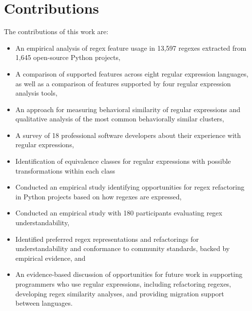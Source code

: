 \section{Contributions}

The contributions of this work are:
\begin{itemize} \setlength \itemsep{.1pt}
    \item An empirical analysis of regex feature usage in 13,597 regexes extracted from 1,645 open-source Python projects,
    \item A comparison of supported features across eight regular expression languages, as well as a comparison of features supported by four regular expression analysis tools,
    \item An approach for measuring behavioral similarity of regular expressions and qualitative analysis of the most common behaviorally similar clusters,
    \item A survey of 18 professional software developers about their experience with regular expressions,
    \item Identification of equivalence classes for regular expressions with possible transformations within each class
    \item Conducted an empirical study identifying opportunities for regex refactoring in Python projects based on how regexes are expressed,
    \item Conducted an empirical study with 180 participants evaluating regex understandability,
    \item Identified preferred regex representations and refactorings for understandability and conformance to community standards, backed by empirical evidence, and
    \item An evidence-based discussion of opportunities for future work in supporting programmers who use regular expressions, including refactoring regexes, developing regex similarity analyses, and providing migration support between languages.
\end{itemize}
